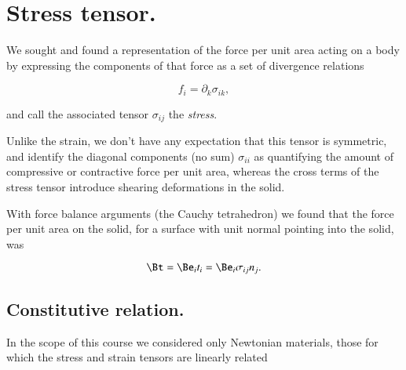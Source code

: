 % 
% 
% 
% 
% 
% 
% 
% 
% 
% 
% 
% 
\chapter{Stress tensor.}

We sought and found a representation of the force per unit area acting on a body by expressing the components of that force as a set of divergence relations

\begin{equation}\label{eqn:continuumElasticityReview:250}
f_i = \partial_k \sigma_{i k},
\end{equation}

and call the associated tensor $\sigma_{ij}$ the \textit{stress}.

Unlike the strain, we don't have any expectation that this tensor is symmetric, and identify the diagonal components (no sum) $\sigma_{i i}$ as quantifying the amount of compressive or contractive force per unit area, whereas the cross terms of the stress tensor introduce shearing deformations in the solid.

With force balance arguments (the Cauchy tetrahedron) we found that the force per unit area on the solid, for a surface with unit normal pointing into the solid, was

\begin{equation}\label{eqn:continuumElasticityReview:270}
\Bt = \Be_i t_i = \Be_i \sigma_{ij} n_j.
\end{equation}

\section{Constitutive relation.}

In the scope of this course we considered only Newtonian materials, those for which the stress and strain tensors are linearly related

